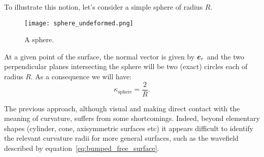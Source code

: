 To illustrate this notion, let's consider a simple sphere of radius $R$. 
\begin{figure}[htbp]
\begin{center}
\texttt{[image: sphere\_undeformed.png]} 
\end{center}
\caption{A sphere.}
\label{fig:sphere}
\end{figure}
At a given point of the surface, the normal vector is given by $\be_r$ and the two perpendicular planes intersecting the sphere will be two (exact) circles each of radius $R$. As a consequence we will have:
\begin{equation}
\kappa_\text{sphere} = \frac{2}{R}.
\end{equation}

The previous approach, although visual and making direct contact with the meaning of curvature, suffers from some shortcomings. Indeed, beyond elementary shapes (cylinder, cone, axisymmetric surfaces etc) it appears difficult to identify the relevant curvature radii for more general surfaces, such as the wavefield described by equation~\eqref{eq:bumped_free_surface}.

